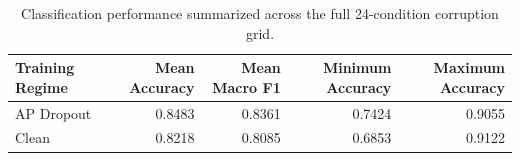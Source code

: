 \begin{table}
\caption{Classification performance summarized across the full 24-condition corruption grid.}
\label{tab:classification_grid}
\begin{tabular}{lrrrr}
\toprule
Training Regime & Mean Accuracy & Mean Macro F1 & Minimum Accuracy & Maximum Accuracy \\
\midrule
AP Dropout & 0.8483 & 0.8361 & 0.7424 & 0.9055 \\
Clean & 0.8218 & 0.8085 & 0.6853 & 0.9122 \\
\bottomrule
\end{tabular}
\end{table}
